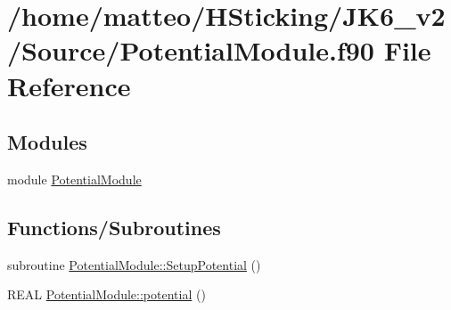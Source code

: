 \hypertarget{_potential_module_8f90}{
\section{/home/matteo/HSticking/JK6\_\-v2/Source/PotentialModule.f90 File Reference}
\label{_potential_module_8f90}
}
\subsection*{Modules}
\begin{DoxyCompactItemize}
\item 
module \hyperlink{namespace_potential_module}{PotentialModule}
\end{DoxyCompactItemize}
\subsection*{Functions/Subroutines}
\begin{DoxyCompactItemize}
\item 
subroutine \hyperlink{namespace_potential_module_a0c5361b39413bf95854a08097d55a022}{PotentialModule::SetupPotential} ()
\item 
REAL \hyperlink{namespace_potential_module_afce25724f08bbb54ef8f643edb2650e2}{PotentialModule::potential} ()
\end{DoxyCompactItemize}
